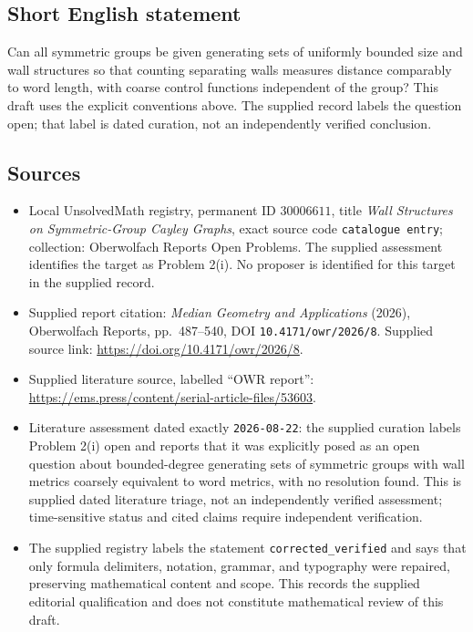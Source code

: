 \documentclass[11pt]{article}
\begin{document}
\subsection{Short English statement}
Can all symmetric groups be given generating sets of uniformly bounded size and wall structures so that counting separating walls measures distance comparably to word length, with coarse control functions independent of the group? This draft uses the explicit conventions above. The supplied record labels the question open; that label is dated curation, not an independently verified conclusion.
\subsection{Sources}
\begin{itemize}
\item Local UnsolvedMath registry, permanent ID \(30006611\), title \emph{Wall Structures on Symmetric-Group Cayley Graphs}, exact source code \texttt{catalogue entry}; collection: Oberwolfach Reports Open Problems. The supplied assessment identifies the target as Problem 2(i). No proposer is identified for this target in the supplied record.
\item Supplied report citation: \emph{Median Geometry and Applications} (2026), Oberwolfach Reports, pp.~487--540, DOI \texttt{10.4171/owr/2026/8}. Supplied source link: \url{https://doi.org/10.4171/owr/2026/8}.
\item Supplied literature source, labelled ``OWR report'': \url{https://ems.press/content/serial-article-files/53603}.
\item Literature assessment dated exactly \texttt{2026-08-22}: the supplied curation labels Problem 2(i) open and reports that it was explicitly posed as an open question about bounded-degree generating sets of symmetric groups with wall metrics coarsely equivalent to word metrics, with no resolution found. This is supplied dated literature triage, not an independently verified assessment; time-sensitive status and cited claims require independent verification.
\item The supplied registry labels the statement \texttt{corrected\_verified} and says that only formula delimiters, notation, grammar, and typography were repaired, preserving mathematical content and scope. This records the supplied editorial qualification and does not constitute mathematical review of this draft.
\end{itemize}
\end{document}
